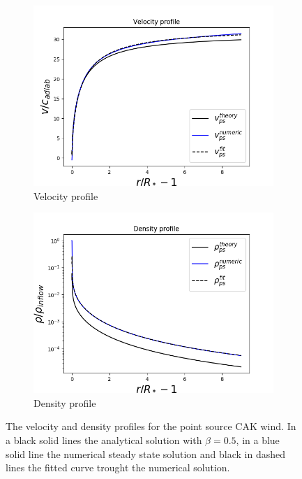 \begin{figure}
\centering
\begin{subfigure}{.8\textwidth}
\includegraphics[width = \textwidth]{CAK_velocity_profile.png}
\caption{Velocity profile}
\label{fig: CAK_v}
\end{subfigure}
\begin{subfigure}{.8\textwidth}
\centering
\includegraphics[width = \textwidth]{CAK_density_profile.png}
\caption{Density profile}
\label{fig: CAK_rho}
\end{subfigure}
\caption{The velocity and density profiles for the point source CAK wind. In a black solid lines the analytical solution with $\beta = 0.5$, in a blue solid line the numerical steady state solution and black in dashed lines the fitted curve trought the numerical solution.}
\label{•}
\end{figure}

